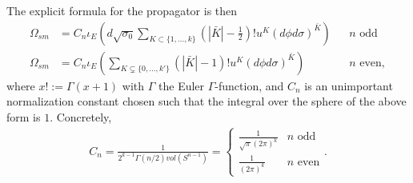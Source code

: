 \documentclass[a4paper]{amsart}
\theoremstyle{plain}
\theoremstyle{definition}
\begin{document}
The explicit formula for the propagator is then 
\begin{align*}
 \Omega_{sm}
&= 
C_n \iota_E
\left( 
d\sqrt{\sigma_0}
\sum_{K\subset \{1,\dots,k\}}
 {(|\bar K|-\frac 1 2)!} u^K (d\phi d\sigma)^{\bar K}
\right)
 && \text{$n$ odd} \\
 \Omega_{sm}
&= 
C_n \iota_E
\left(
\sum_{K\subsetneq \{0,\dots,k'\}}
 {(|\bar K|-1)!} u^K (d\phi d\sigma)^{\bar K}
\right)
&& \text{$n$ even},
\end{align*}
where $x!:=\Gamma(x+1)$ with $\Gamma$ the Euler $\Gamma$-function, and $C_n$ is an unimportant normalization constant chosen such that the integral over the sphere of the above form is $1$. Concretely,
\begin{align*}
C_n = \frac{1}{2^{k-1} \Gamma(n/2) \mathit{vol}(S^{n-1})} = 
\begin{cases}
\frac{1}{\sqrt{\pi}(2\pi)^k } & \text{$n$ odd} \\ 
\frac{1}{(2\pi)^k } & \text{$n$ even} 
\end{cases}.
\end{align*}
\end{document}
